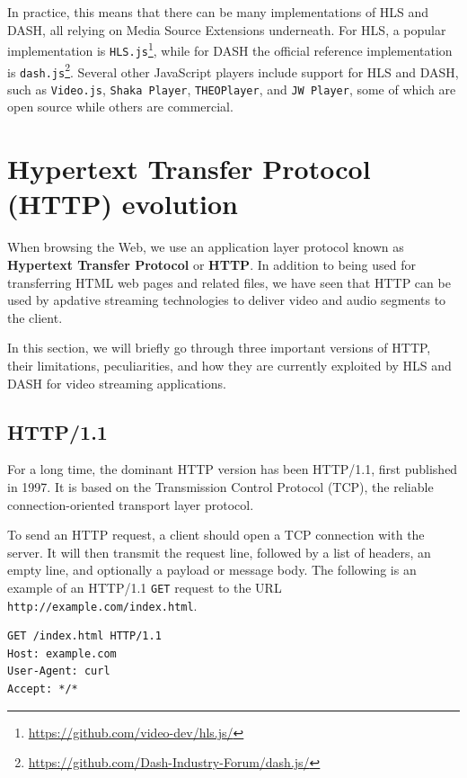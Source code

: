 In practice, this means that there can be many implementations of HLS and DASH, all relying on Media Source Extensions underneath. For HLS, a popular implementation is \texttt{HLS.js}\footnote{\url{https://github.com/video-dev/hls.js/}}, while for DASH the official reference implementation is \texttt{dash.js}\footnote{\url{https://github.com/Dash-Industry-Forum/dash.js/}}. Several other JavaScript players include support for HLS and DASH, such as \texttt{Video.js}, \texttt{Shaka Player}, \texttt{THEOPlayer}, and \texttt{JW Player}, some of which are open source while others are commercial.

\section{Hypertext Transfer Protocol (HTTP) evolution}
\label{sec:bg/http}

When browsing the Web, we use an application layer protocol known as \textbf{Hypertext Transfer Protocol} or \textbf{HTTP}. In addition to being used for transferring HTML web pages and related files, we have seen that HTTP can be used by apdative streaming technologies to deliver video and audio segments to the client.

In this section, we will briefly go through three important versions of HTTP, their limitations, peculiarities, and how they are currently exploited by HLS and DASH for video streaming applications.


\subsection{HTTP/1.1}
\label{sec:bg/http1}

For a long time, the dominant HTTP version has been HTTP/1.1, first published in 1997.\cite{http1.1} It is based on the Transmission Control Protocol (TCP), the reliable connection-oriented transport layer protocol.

To send an HTTP request, a client should open a TCP connection with the server. It will then transmit the request line, followed by a list of headers, an empty line, and optionally a payload or message body. The following is an example of an HTTP/1.1 \texttt{GET} request to the URL \texttt{http://example.com/index.html}.

\begin{verbatim}
GET /index.html HTTP/1.1
Host: example.com
User-Agent: curl
Accept: */*
\end{verbatim}

